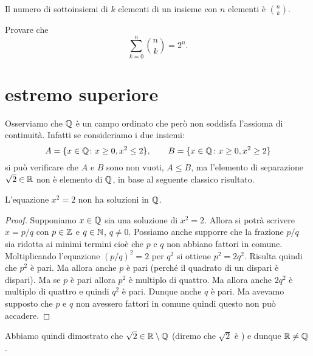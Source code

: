 \begin{exercise}
Il numero di sottoinsiemi di $k$ elementi di un insieme con $n$ elementi
è ${n\choose k}$.
\end{exercise}

\begin{exercise}
Provare che
\[
 \sum_{k=0}^n {n \choose k} = 2^n.
\]
\end{exercise}

\section{estremo superiore}

Osserviamo che $\mathbb Q$ è un campo ordinato che però non soddisfa l'assioma
di continuità.
Infatti se consideriamo i due insiemi:
\[
 A = \{x\in \mathbb Q \colon x\ge 0, x^2 \le 2\},\qquad
 B = \{x\in \mathbb Q \colon x\ge 0, x^2 \ge 2\}
\]
si può verificare che $A$ e $B$ sono non vuoti, $A \le B$, ma l'elemento
di separazione $\sqrt{2}\in \mathbb R$ non è elemento di $\mathbb Q$, in base al seguente
classico risultato.

\begin{theorem}[Pitagora]
\mymark{**}
L'equazione $x^2=2$ non ha soluzioni in $\mathbb Q$.
\end{theorem}
%
\begin{proof}
\mymark{*}
Supponiamo $x\in \mathbb Q$ sia una soluzione di $x^2=2$.
Allora si potrà scrivere $x=p/q$ con $p\in \mathbb Z$ e $q\in \mathbb N$, $q\neq 0$.
Possiamo anche supporre che la frazione $p/q$ sia ridotta ai minimi
termini cioè che $p$ e $q$ non abbiano fattori in comune.
Moltiplicando l'equazione
$(p/q)^2=2$ per $q^2$ si ottiene $p^2 = 2 q^2$.
Risulta quindi che $p^2$ è pari.
Ma allora anche $p$ è pari (perché il quadrato di un dispari è dispari).
Ma se $p$ è pari allora $p^2$ è multiplo di quattro.
Ma allora anche $2q^2$ è multiplo di quattro e quindi $q^2$ è pari.
Dunque anche $q$ è pari. Ma avevamo supposto che $p$ e $q$ non avessero
fattori in comune quindi questo non può accadere.
\end{proof}

Abbiamo quindi dimostrato che $\sqrt{2} \in \mathbb R \setminus \mathbb Q$
(diremo che $\sqrt 2$ è ) e dunque $\mathbb R \neq \mathbb Q$.

